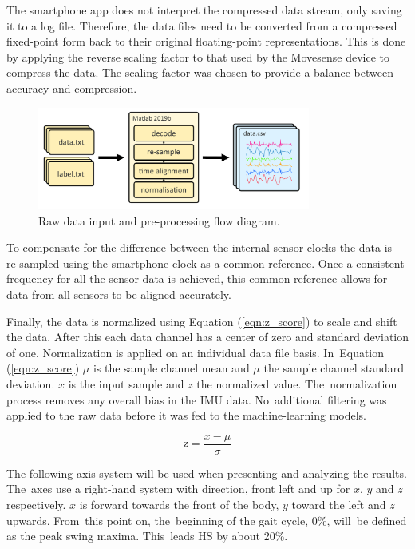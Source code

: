 The smartphone app does not interpret the compressed data stream, only saving it to a log file. Therefore, the data files need to be converted from a compressed fixed-point form back to their original floating-point representations. This is done by applying the reverse scaling factor to that used by the Movesense device to compress the data. The scaling factor was chosen to provide a balance between accuracy and compression.

\begin{figure}[!hbt]
    \centering
    \includegraphics[width=0.8\textwidth]{content/4-LSTM_Behaviour/data_processing.pdf}
    \caption{Raw data input and pre-processing flow diagram.}
    \label{fig:data_processing}
\end{figure}


To compensate for the difference between the internal sensor clocks the data is re-sampled using the smartphone clock as a common reference. Once a consistent frequency for all the sensor data is achieved, this common reference allows for data from all sensors to be aligned accurately.

Finally, the data is normalized using Equation (\ref{eqn:z_score}) to scale and shift the data. After this each data channel has a center of zero and standard deviation of one. Normalization is applied on an individual data file basis. In~Equation (\ref{eqn:z_score}) $\mu$ is the sample channel mean and $\mu$ the sample channel standard deviation. $x$ is the input sample and $z$ the normalized value. The~normalization process removes any overall bias in the IMU data. No~additional filtering was applied to the raw data before it was fed to the machine-learning models.

\begin{equation}
    \text{z} = \frac{x-\mu}{\sigma}
    \label{eqn:z_score}
\end{equation}

The following axis system will be used when presenting and analyzing the results. The~axes use a right-hand system with direction, front left and up for $x$, $y$ and $z$ respectively. $x$ is forward towards the front of the body, $y$ toward the left and $z$ upwards. From~this point on, the~beginning of the gait cycle, 0\%, will~be defined as the peak swing maxima. This~leads HS by about 20\%. 


